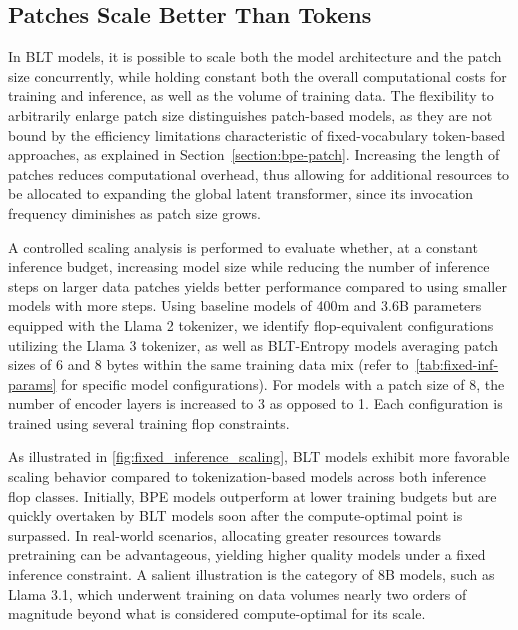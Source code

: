 \subsection{Patches Scale Better Than Tokens} In {\textsc BLT} models, it is possible to scale both the model architecture and the patch size concurrently, while holding constant both the overall computational costs for training and inference, as well as the volume of training data. The flexibility to arbitrarily enlarge patch size distinguishes patch-based models, as they are not bound by the efficiency limitations characteristic of fixed-vocabulary token-based approaches, as explained in Section~\ref{section:bpe-patch}. Increasing the length of patches reduces computational overhead, thus allowing for additional resources to be allocated to expanding the global latent transformer, since its invocation frequency diminishes as patch size grows.

A controlled scaling analysis is performed to evaluate whether, at a constant inference budget, increasing model size while reducing the number of inference steps on larger data patches yields better performance compared to using smaller models with more steps. Using baseline models of 400m and 3.6B parameters equipped with the Llama 2 tokenizer, we identify flop-equivalent configurations utilizing the Llama 3 tokenizer, as well as {\textsc BLT}-Entropy models averaging patch sizes of 6 and 8 bytes within the same training data mix (refer to~\autoref{tab:fixed-inf-params} for specific model configurations). For models with a patch size of 8, the number of encoder layers is increased to 3 as opposed to 1. Each configuration is trained using several training flop constraints.

As illustrated in \autoref{fig:fixed_inference_scaling}, {\textsc BLT} models exhibit more favorable scaling behavior compared to tokenization-based models across both inference flop classes. Initially, BPE models outperform at lower training budgets but are quickly overtaken by {\textsc BLT} models soon after the compute-optimal point is surpassed. In real-world scenarios, allocating greater resources towards pretraining can be advantageous, yielding higher quality models under a fixed inference constraint. A salient illustration is the category of 8B models, such as Llama 3.1, which underwent training on data volumes nearly two orders of magnitude beyond what is considered compute-optimal for its scale.

